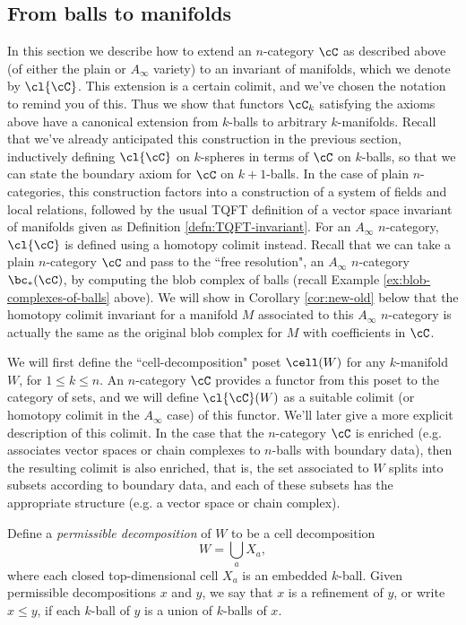 \subsection{From balls to manifolds}
\label{ss:ncat_fields} \label{ss:ncat-coend}
In this section we describe how to extend an $n$-category $\cC$ as described above 
(of either the plain or $A_\infty$ variety) to an invariant of manifolds, which we denote by $\cl{\cC}$.
This extension is a certain colimit, and we've chosen the notation to remind you of this.
Thus we show that functors $\cC_k$ satisfying the axioms above have a canonical extension 
from $k$-balls to arbitrary $k$-manifolds.
Recall that we've already anticipated this construction in the previous section, 
inductively defining $\cl{\cC}$ on $k$-spheres in terms of $\cC$ on $k$-balls, 
so that we can state the boundary axiom for $\cC$ on $k+1$-balls.
In the case of plain $n$-categories, this construction factors into a construction of a 
system of fields and local relations, followed by the usual TQFT definition of a 
vector space invariant of manifolds given as Definition \ref{defn:TQFT-invariant}.
For an $A_\infty$ $n$-category, $\cl{\cC}$ is defined using a homotopy colimit instead.
Recall that we can take a plain $n$-category $\cC$ and pass to the ``free resolution", 
an $A_\infty$ $n$-category $\bc_*(\cC)$, by computing the blob complex of balls (recall Example \ref{ex:blob-complexes-of-balls} above).
We will show in Corollary \ref{cor:new-old} below that the homotopy colimit invariant 
for a manifold $M$ associated to this $A_\infty$ $n$-category is actually the same as the original blob complex  for $M$ with coefficients in $\cC$.

We will first define the ``cell-decomposition" poset $\cell(W)$ for any $k$-manifold $W$, for $1 \leq k \leq n$. 
An $n$-category $\cC$ provides a functor from this poset to the category of sets, 
and we  will define $\cl{\cC}(W)$ as a suitable colimit 
(or homotopy colimit in the $A_\infty$ case) of this functor. 
We'll later give a more explicit description of this colimit.
In the case that the $n$-category $\cC$ is enriched (e.g. associates vector spaces or chain complexes to $n$-balls with boundary data), 
then the resulting colimit is also enriched, that is, the set associated to $W$ splits into subsets according to boundary data, and each of these subsets has the appropriate structure (e.g. a vector space or chain complex).

Define a {\it permissible decomposition} of $W$ to be a cell decomposition
\[
	W = \bigcup_a X_a ,
\]
where each closed top-dimensional cell $X_a$ is an embedded $k$-ball.
Given permissible decompositions $x$ and $y$, we say that $x$ is a refinement
of $y$, or write $x \le y$, if each $k$-ball of $y$ is a union of $k$-balls of $x$.

